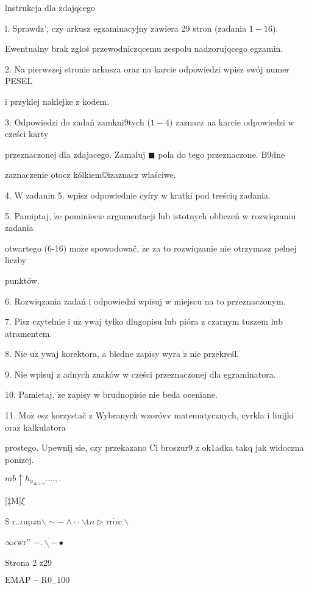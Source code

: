 \documentclass[a4paper,12pt]{article}
\begin{document}
lnstrukcja dla zdajqcego

l. Sprawdz', czy arkusz egzaminacyjny zawiera 29 stron (zadania $1-16$).

Ewentualny brak zgloś przewodniczqcemu zespolu nadzorujqcego egzamin.

2. Na pierwszej stronie arkusza oraz na karcie odpowiedzi wpisz swój numer PESEL

i przyklej naklejke z kodem.

3. Odpowiedzi do zadań $\mathrm{z}\mathrm{a}\mathrm{m}\mathrm{k}\mathrm{n}\mathrm{i}9$tych ($1-4)$ zaznacz na karcie odpowiedzi w cześci karty

przeznaczonej dla zdajacego. Zamaluj $\blacksquare$ pola do tego przeznaczone. $\mathrm{B}9\mathrm{d}\mathrm{n}\mathrm{e}$

zaznaczenie otocz kólkiem\copyright izaznacz wlaściwe.

4. $\mathrm{W}$ zadaniu 5. wpisz odpowiednie cyfry w kratki pod treściq zadania.

5. Pamiptaj, $\dot{\mathrm{z}}\mathrm{e}$ pominiecie argumentacji lub istotnych obliczeń w rozwiqzaniu zadania

otwartego (6-16) $\mathrm{m}\mathrm{o}\dot{\mathrm{z}}\mathrm{e}$ spowodowač, $\dot{\mathrm{z}}\mathrm{e}$ za to rozwiqzanie nie otrzymasz pelnej liczby

punktów.

6. Rozwiqzania zadań i odpowiedzi wpisuj w miejscu na to przeznaczonym.

7. Pisz czytelnie i $\mathrm{u}\dot{\mathrm{z}}$ ywaj tylko dlugopisu lub pióra z czarnym tuszem lub atramentem.

8. Nie $\mathrm{u}\dot{\mathrm{z}}$ ywaj korektora, a bledne zapisy wyra $\acute{\mathrm{z}}$ nie przekreśl.

9. Nie wpisuj $\dot{\mathrm{z}}$ adnych znaków w cześci przeznaczonej dla egzaminatora.

10. Pamietaj, $\dot{\mathrm{z}}\mathrm{e}$ zapisy w brudnopisie nie beda oceniane.

11. $\mathrm{M}\mathrm{o}\dot{\mathrm{z}}$ esz korzystač z Wybranych wzoróvv matematycznych, cyrkla i linijki oraz kalkulatora

prostego. Upewnij $\mathrm{s}\mathrm{i}\mathrm{e}$, czy przekazano Ci broszur9 z ok1adka takq jak widoczna ponizej.

$mb\uparrow h_{a_{\Delta>0}}\ldots.,.$

[‡M]$\xi$

{\$} $\mathrm{r}..\iota \mathrm{u}\mathrm{p}z\mathrm{n}\backslash \sim-\wedge\cdot\cdot \backslash \mathrm{t}n\triangleright\tau \mathrm{r}\dot{\alpha}\mathrm{c}\backslash $

$\overline{\infty\epsilon \mathrm{w}\mathrm{r}}$'' $-\underline{\overline{.\backslash -}}\bullet$

Strona 2 z29

$\mathrm{E}\mathrm{M}\mathrm{A}\mathrm{P}-\mathrm{R}0_{-}100$
\end{document}
